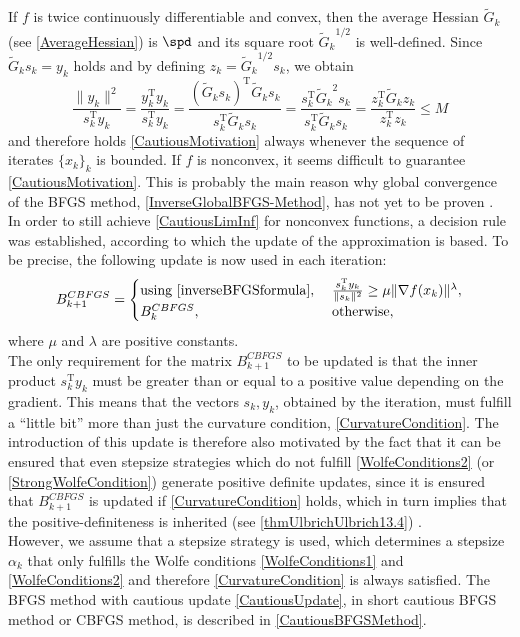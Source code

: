 If $f$ is twice continuously differentiable and convex, then the average Hessian $\tilde{G}_k$ (see \cref{AverageHessian}) is $\spd$ and its square root ${\tilde{G}_k}^{1/2}$ is well-defined. Since $\tilde{G}_k s_k = y_k$ holds and by defining $z_k = {\tilde{G}_k}^{1/2} s_k$, we obtain
\begin{equation*}
    \frac{\lVert y_k \rVert^2}{s^{\mathrm{T}}_k y_k} = \frac{y^{\mathrm{T}}_k y_k}{s^{\mathrm{T}}_k y_k} = \frac{(\tilde{G}_k s_k)^{\mathrm{T}} \tilde{G}_k s_k}{s^{\mathrm{T}}_k \tilde{G}_k s_k} = \frac{s_k^{\mathrm{T}} {\tilde{G}_k}^2 s_k}{s_k^{\mathrm{T}} \tilde{G}_k s_k} = \frac{z_k^{\mathrm{T}} \tilde{G}_k z_k}{z_k^{\mathrm{T}} z_k}\leq M
\end{equation*}
and therefore holds \cref{CautiousMotivation} always whenever the sequence of iterates $\{ x_k \}_k$ is bounded.  If $f$ is nonconvex, it seems difficult to guarantee \cref{CautiousMotivation}. This is probably the main reason why global convergence of the BFGS method, \cref{InverseGlobalBFGS-Method}, has not yet to be proven \cite[p.~1056]{LiFukushima:2001}. \\
In order to still achieve \cref{CautiousLimInf} for nonconvex functions, a decision rule was established, according to which the update of the approximation is based. To be precise, the following update is now used in each iteration:
\begin{equation}\label{CautiousUpdate}
    B^{CBFGS}_{k+1} = \begin{cases} \text{using \cref{inverseBFGSformula}}, & \; \frac{s^{\mathrm{T}}_k y_k}{\lVert s_k \rVert^{2}} \geq \mu \lVert \nabla f(x_k) \rVert^{\lambda}, \\ B^{CBFGS}_k, & \; \text{otherwise}, \end{cases}
\end{equation}
where $\mu$ and $\lambda$ are positive constants. \\
The only requirement for the matrix $B^{CBFGS}_{k+1}$ to be updated is that the inner product $s^{\mathrm{T}}_k y_k$ must be greater than or equal to a positive value depending on the gradient. This means that the vectors $s_k, y_k$, obtained by the iteration, must fulfill a “little bit” more than just the curvature condition, \cref{CurvatureCondition}. The introduction of this update is therefore also motivated by the fact that it can be ensured that even stepsize strategies which do not fulfill \cref{WolfeConditions2} (or \cref{StrongWolfeCondition}) generate positive definite updates, since it is ensured that $B^{CBFGS}_{k+1}$ is updated if \cref{CurvatureCondition} holds, which in turn implies that the positive-definiteness is inherited (see \cref{thmUlbrichUlbrich13.4}) \cite[p.~1061]{LiFukushima:2001}. \\
However, we assume that a stepsize strategy is used, which determines a stepsize $\alpha_k$ that only fulfills the Wolfe conditions \cref{WolfeConditions1} and \cref{WolfeConditions2} and therefore \cref{CurvatureCondition} is always satisfied. The BFGS method with cautious update \cref{CautiousUpdate}, in short cautious BFGS method or CBFGS method, is described in \cref{CautiousBFGSMethod}. \\

